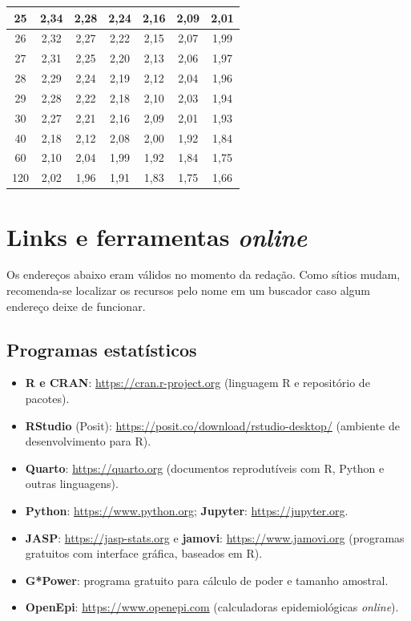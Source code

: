 \documentclass[
]{book}
\providecommand{\tightlist}{%
  \setlength{\itemsep}{0pt}\setlength{\parskip}{0pt}}
\begin{document}
\begin{table}
\begin{tabular}[t]{c|c|c|c|c|c|c}
\hline
25 & 2,34 & 2,28 & 2,24 & 2,16 & 2,09 & 2,01\\
\hline
26 & 2,32 & 2,27 & 2,22 & 2,15 & 2,07 & 1,99\\
\hline
27 & 2,31 & 2,25 & 2,20 & 2,13 & 2,06 & 1,97\\
\hline
28 & 2,29 & 2,24 & 2,19 & 2,12 & 2,04 & 1,96\\
\hline
29 & 2,28 & 2,22 & 2,18 & 2,10 & 2,03 & 1,94\\
\hline
30 & 2,27 & 2,21 & 2,16 & 2,09 & 2,01 & 1,93\\
\hline
40 & 2,18 & 2,12 & 2,08 & 2,00 & 1,92 & 1,84\\
\hline
60 & 2,10 & 2,04 & 1,99 & 1,92 & 1,84 & 1,75\\
\hline
120 & 2,02 & 1,96 & 1,91 & 1,83 & 1,75 & 1,66\\
\hline
\end{tabular}
\end{table}

\section{\texorpdfstring{Links e ferramentas \emph{online}}{Links e ferramentas online}}\label{links-e-ferramentas-online}

Os endereços abaixo eram válidos no momento da redação. Como sítios mudam, recomenda-se localizar os recursos pelo nome em um buscador caso algum endereço deixe de funcionar.

\subsection{Programas estatísticos}\label{programas-estatuxedsticos}

\begin{itemize}
\tightlist
\item
  \textbf{R e CRAN}: \url{https://cran.r-project.org} (linguagem R e repositório de pacotes).
\item
  \textbf{RStudio} (Posit): \url{https://posit.co/download/rstudio-desktop/} (ambiente de desenvolvimento para R).
\item
  \textbf{Quarto}: \url{https://quarto.org} (documentos reprodutíveis com R, Python e outras linguagens).
\item
  \textbf{Python}: \url{https://www.python.org}; \textbf{Jupyter}: \url{https://jupyter.org}.
\item
  \textbf{JASP}: \url{https://jasp-stats.org} e \textbf{jamovi}: \url{https://www.jamovi.org} (programas gratuitos com interface gráfica, baseados em R).
\item
  \textbf{G*Power}: programa gratuito para cálculo de poder e tamanho amostral.
\item
  \textbf{OpenEpi}: \url{https://www.openepi.com} (calculadoras epidemiológicas \emph{online}).
\end{itemize}
\end{document}
